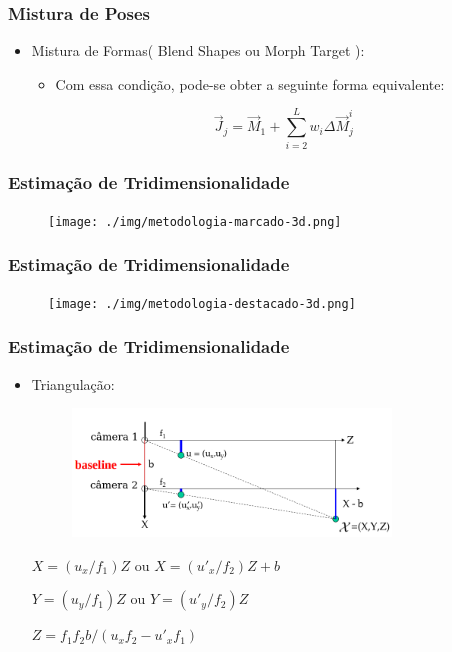 \documentclass[brazil]{beamer}
\begin{document}
\begin{frame}
\frametitle{Mistura de Poses}
  \begin{itemize}
  	
  	\item Mistura de Formas( Blend Shapes ou Morph Target ):
  	
  	
 	 	\begin{itemize}
          \item Com essa condição, pode-se obter a seguinte forma equivalente:
      
          \begin{equation}
            \vec{J}_j = \vec{M}_1 + \sum_{i = 2}^L w_i \Delta \vec{M}_j^i 
          \end{equation}

    \end{itemize} 

  \end{itemize} 
\end{frame}

\begin{frame}
\frametitle{Estimação de Tridimensionalidade}
        \begin{figure}
            \centering
            \texttt{[image: ./img/metodologia-marcado-3d.png]}
      \end{figure}
\end{frame}

\begin{frame}
\frametitle{Estimação de Tridimensionalidade}      

 \begin{figure}
            \centering
            \texttt{[image: ./img/metodologia-destacado-3d.png]}
      \end{figure}
\end{frame}

\begin{frame}
\frametitle{Estimação de Tridimensionalidade}
  \begin{itemize}
      \item Triangulação:
      
      \begin{figure}
        \centering
        \includegraphics[width = 0.8\textwidth, keepaspectratio]{./img/TG_triangulation_pdf_washington_pt2.png}
      \end{figure}
      
      $X = (u_x/f_1)  Z$ ou $ X = (u'_x/f_2)  Z + b $
      
      $Y = (u_y/f_1) Z$ ou $ Y = (u'_y/f_2) Z$
      
      $Z = f_1  f_2  b / (u_x  f_2 - u'_x  f_1)$
      
  \end{itemize} 
\end{frame}
\end{document}
